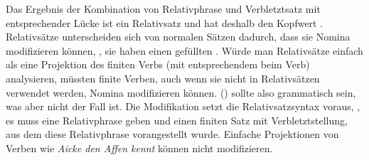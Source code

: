 Das Ergebnis der Kombination von Relativphrase und Verbletztsatz mit entsprechender Lücke ist ein Relativsatz und hat deshalb den Kopfwert
.\label{Erklaerung-relativizer} Relativsätze unterscheiden sich von normalen Sätzen dadurch, dass sie Nomina
modifizieren können, \dash, sie haben einen gefüllten \modw. Würde man Relativsätze einfach als eine
Projektion des finiten Verbs (mit entsprechendem \modw beim Verb) analysieren, müssten finite Verben,
auch wenn sie nicht in Relativsätzen verwendet werden, Nomina modifizieren können. () sollte
also grammatisch sein, was aber nicht der Fall ist.
\z
Die Modifikation setzt die Relativsatzsyntax voraus, \dash, es muss eine Relativphrase geben und einen
finiten Satz mit Verbletztstellung, aus dem diese Relativphrase vorangestellt wurde. Einfache
Projektionen von Verben wie \emph{Aicke den Affen kennt} können nicht modifizieren.



